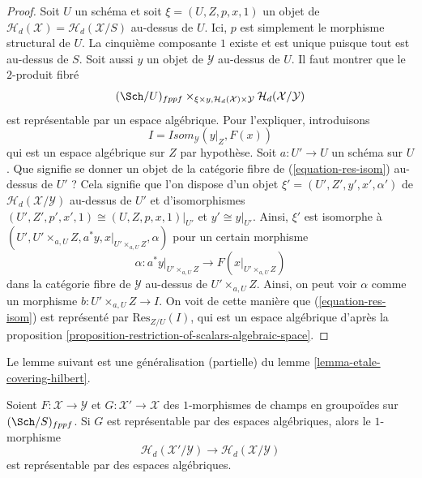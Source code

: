 \begin{proof}
Soit $U$ un schéma et soit $\xi = (U, Z, p, x, 1)$ un objet de
$\mathcal{H}_d(\mathcal{X}) = \mathcal{H}_d(\mathcal{X}/S)$ au-dessus de $U$.
Ici, $p$ est simplement le morphisme structural de $U$.
La cinquième composante $1$ existe et est unique
puisque tout est au-dessus de $S$.
Soit aussi $y$ un objet de $\mathcal{Y}$ au-dessus de $U$.
Il faut montrer que le $2$-produit fibré
\begin{equation}
\label{equation-res-isom}
(\Sch/U)_{fppf}
\times_{\xi \times y, \mathcal{H}_d(\mathcal{X}) \times \mathcal{Y}}
\mathcal{H}_d(\mathcal{X}/\mathcal{Y})
\end{equation}
est représentable par un espace algébrique. Pour l'expliquer,
introduisons
$$
I = \mathit{Isom}_\mathcal{Y}(y|_Z, F(x))
$$
qui est un espace algébrique sur $Z$ par hypothèse. Soit $a : U' \to U$
un schéma sur $U$. Que signifie se donner un objet de la catégorie
fibre de (\ref{equation-res-isom}) au-dessus de $U'$ ? Cela signifie que l'on
dispose d'un objet $\xi' = (U', Z', y', x', \alpha')$ de
$\mathcal{H}_d(\mathcal{X}/\mathcal{Y})$ au-dessus de $U'$ et d'isomorphismes
$(U', Z', p', x', 1) \cong (U, Z, p, x, 1)|_{U'}$ et
$y' \cong y|_{U'}$. Ainsi, $\xi'$ est isomorphe à
$(U', U' \times_{a, U} Z, a^*y, x|_{U' \times_{a, U} Z}, \alpha)$
pour un certain morphisme
$$
\alpha :
a^*y|_{U' \times_{a, U} Z}
\longrightarrow
F(x|_{U' \times_{a, U} Z})
$$
dans la catégorie fibre de $\mathcal{Y}$ au-dessus de $U' \times_{a, U} Z$. Ainsi,
on peut voir $\alpha$ comme un morphisme $b : U' \times_{a, U} Z \to I$.
On voit de cette manière que (\ref{equation-res-isom})
est représenté par $\text{Res}_{Z/U}(I)$, qui est un espace algébrique d'après la
proposition \ref{proposition-restriction-of-scalars-algebraic-space}.
\end{proof}

\noindent
Le lemme suivant est une généralisation (partielle) du
lemme \ref{lemma-etale-covering-hilbert}.

\begin{lemma}
\label{lemma-representable-on-top}
Soient $F : \mathcal{X} \to \mathcal{Y}$ et $G : \mathcal{X}' \to \mathcal{X}$
des $1$-morphismes de champs en groupoïdes sur $(\Sch/S)_{fppf}$.
Si $G$ est représentable par des espaces algébriques, alors le $1$-morphisme
$$
\mathcal{H}_d(\mathcal{X}'/\mathcal{Y})
\longrightarrow
\mathcal{H}_d(\mathcal{X}/\mathcal{Y})
$$
est représentable par des espaces algébriques.
\end{lemma}


